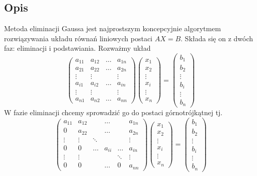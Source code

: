 \documentclass[11pt,wide]{mwart}
\begin{document}
\subsection{Opis} \label{p:gaussopis}
Metoda eliminacji Gaussa jest najprostszym koncepcyjnie algorytmem rozwiązywania układu równań liniowych postaci $ AX = B $.
Składa się on z dwóch faz: eliminacji i podstawiania. Rozważmy układ
$$
\left(\begin{matrix}
a_{11} & a_{12} & \ldots & a_{1n} \\
a_{21} & a_{22} & \ldots & a_{2n} \\
\vdots & \vdots & 		 & \vdots \\
a_{i1} & a_{i2} & \ldots & a_{in} \\
\vdots & \vdots & 		 & \vdots \\
a_{n1} & a_{n2} & \ldots & a_{nn}
\end{matrix}\right)
\left(\begin{matrix}
x_1 \\ x_2 \\ \vdots \\ x_i \\ \vdots \\ x_n
\end{matrix}\right) = 
\left(\begin{matrix}
b_1 \\ b_2 \\ \vdots \\ b_i \\ \vdots \\ b_n
\end{matrix}\right)
$$
W fazie eliminacji chcemy sprowadzić go do postaci górnotrójkątnej tj.
$$
\left(\begin{matrix}
a_{11} & a_{12} &  & \ldots  & & a_{1n} \\
0 & a_{22} &  & \ldots  & & a_{2n} \\
\vdots & \vdots & \ddots &		 & & \vdots \\
0 & 0 & \ldots & a_{ii}  & \ldots & a_{in} \\
\vdots & \vdots &  &		 & \ddots & \vdots \\
0 & 0 &  & \ldots  & 0 & a_{nn}
\end{matrix}\right)
\left(\begin{matrix}
x_1 \\ x_2 \\ \vdots \\ x_i \\ \vdots \\ x_n
\end{matrix}\right) = 
\left(\begin{matrix}
b_1 \\ b_2 \\ \vdots \\ b_i \\ \vdots \\ b_n
\end{matrix}\right)
$$
\end{document}

